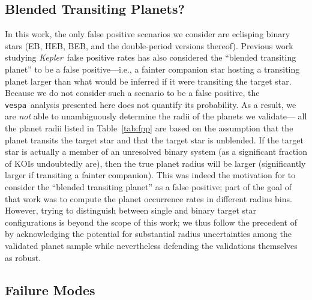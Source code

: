 \documentclass{emulateapj}
\newcommand{\Tab}[1]{Table~\ref{tab:#1}}
\newcommand{\tab}[1]{\Tab{#1}}
\newcommand{\sectlabel}[1]{\label{sect:#1}}
\newcommand{\kepler}{\textit{Kepler}}
\newcommand{\vespa}{\texttt{vespa}}
\begin{document}

\subsection{Blended Transiting Planets?}
\sectlabel{btp}

In this work, the only false positive scenarios we consider are 
eclisping binary stars (EB, HEB, BEB, and the double-period versions
thereof).  Previous work studying \kepler\ false positive rates
\citep[e.g.][]{Fressin:2013} has also considered the  ``blended transiting
planet'' to be a false positive---i.e.,  a fainter companion
star hosting a transiting planet larger than what would be inferred if
it were transiting the target star.  Because we do not consider such
a scenario to be a false positive, the \vespa\ analysis presented here 
does not quantify its probability.  As a result, we are \textit{not}
able to unambiguously determine the radii of the planets we validate---
all the planet radii listed in \tab{fpp} are based on the assumption
that the planet transits the target star and that the target star is 
unblended.  If the target star is actually a member of an unresolved
binary system (as a significant fraction of KOIs undoubtedly are),
then the true planet radius will be larger (significantly larger 
if transiting a fainter companion).  This was indeed the motivation
for \citet{Fressin:2013} to consider the ``blended transiting planet''
as a false positive; part of the goal of that work was to 
compute the planet occurrence rates in different radius bins.  
However, trying to distinguish between single and binary target
star configurations is beyond the scope of this work; we thus follow
the precedent of \citet[][especially Section 5]{Lissauer:2014} by 
acknowledging the potential for substantial radius
uncertainties among the validated planet sample while nevertheless 
defending the validations themselves as robust.   


\subsection{Failure Modes}
\sectlabel{failures}
\end{document}
